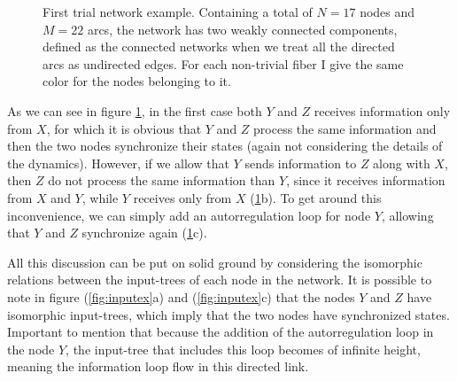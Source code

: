 \documentclass[12pt]{diazessay} %
\begin{document}
\begin{figure}[h]
	\caption{First trial network example. Containing a total of $N = 17$ nodes and $M = 22$ arcs, the network has two weakly connected components, defined as the connected networks when we treat all the directed arcs as undirected edges. For each non-trivial fiber I give the same color for the nodes belonging to it.}
	\label{fig:ex}
\end{figure}

As we can see in figure \ref{fig:ex}, in the first case both $Y$ and $Z$ receives information only from $X$, for which it is obvious that $Y$ and $Z$ process the same information and then the two nodes synchronize their states (again not considering the details of the dynamics). However, if we allow that $Y$ sends information to $Z$ along with $X$, then $Z$ do not process the same information than $Y$, since it receives information from $X$ and $Y$, while $Y$ receives only from $X$ (\ref{fig:ex}b). To get around this inconvenience, we can simply add an autorregulation loop for node $Y$, allowing that $Y$ and $Z$ synchronize again (\ref{fig:ex}c).

All this discussion can be put on solid ground by considering the isomorphic relations between the input-trees of each node in the network. It is possible to note in figure (\ref{fig:inputex}a) and (\ref{fig:inputex}c) that the nodes $Y$ and $Z$ have isomorphic input-trees, which imply that the two nodes have synchronized states. Important to mention that because the addition of the autorregulation loop in the node $Y$, the input-tree that includes this loop becomes of infinite height, meaning the information loop flow in this directed link.
\end{document}
